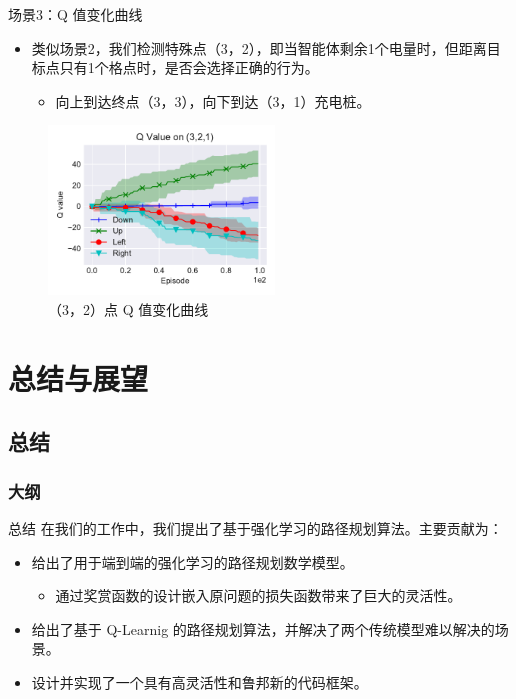 \documentclass{beamer}
\begin{document}
\begin{frame}{场景3：Q 值变化曲线}
    \begin{itemize}
        \item 类似场景2，我们检测特殊点（3，2），即当智能体剩余1个电量时，但距离目标点只有1个格点时，是否会选择正确的行为。
        \begin{itemize}
            \item 向上到达终点（3，3），向下到达（3，1）充电桩。
        \end{itemize}
    \end{itemize}
    \begin{figure}
      \centering
      \includegraphics[width=6.0cm]{pic/case3/3,2,1.pdf}
    \caption{（3，2）点 Q 值变化曲线}
    \label{fig:case2qvalue}
    \end{figure}
\end{frame}

\section{总结与展望}
\subsection{总结}
\begin{frame}
\frametitle{大纲} %
\tableofcontents
    [
        currentsection,
        currentsubsection,
        subsectionstyle=show/shaded/hide
    ]
\end{frame}
\begin{frame}{总结}
    在我们的工作中，我们提出了基于强化学习的路径规划算法。主要贡献为：
    \begin{itemize}
        \item 给出了用于端到端的强化学习的路径规划数学模型。
        \begin{itemize}
            \item 通过奖赏函数的设计嵌入原问题的损失函数带来了巨大的灵活性。
        \end{itemize}
        \item 给出了基于 Q-Learnig 的路径规划算法，并解决了两个传统模型难以解决的场景。
        \item 设计并实现了一个具有高灵活性和鲁邦新的代码框架。
    \end{itemize}
\end{frame}
\end{document}
